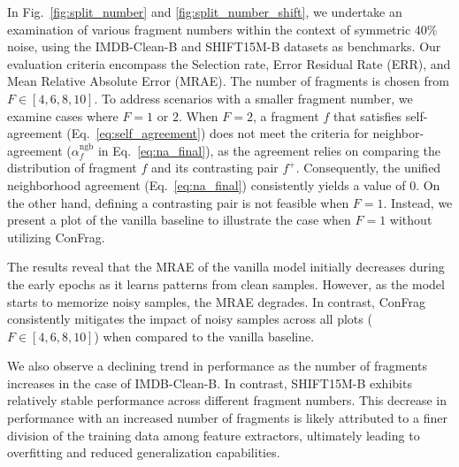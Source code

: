 \documentclass{article}
\theoremstyle{plain}
\theoremstyle{definition}
\theoremstyle{remark}
\begin{document}

In Fig.~\ref{fig:split_number} and \ref{fig:split_number_shift}, we undertake an examination of various fragment numbers within the context of symmetric 40\% noise, using the IMDB-Clean-B and SHIFT15M-B datasets as benchmarks. 
Our evaluation criteria encompass the Selection rate, Error Residual Rate (ERR), and Mean Relative Absolute Error (MRAE).
The number of fragments is chosen from $F\in[4, 6, 8, 10]$.
To address scenarios with a smaller fragment number, we examine cases where $F=1$ or $2$.
When $F=2$, a fragment $f$ that satisfies self-agreement (Eq.~\ref{eq:self_agreement}) does not meet the criteria for neighbor-agreement ($\alpha^\text{ngb}_f$ in Eq.~\ref{eq:na_final}),
as the agreement relies on comparing the distribution of fragment $f$ and its contrasting pair $f^+$.
Consequently, the unified neighborhood agreement (Eq.~\ref{eq:na_final}) consistently yields a value of $0$.
On the other hand, defining a contrasting pair is not feasible when $F=1$.
Instead, we present a plot of the vanilla baseline to illustrate the case when $F=1$ without utilizing ConFrag.

The results reveal that the MRAE of the vanilla model initially decreases during the early epochs as it learns patterns from clean samples.
However, as the model starts to memorize noisy samples, the MRAE degrades.
In contrast, ConFrag consistently mitigates the impact of noisy samples across all plots ($F\in[4,6,8,10]$) when compared to the vanilla baseline.

We also observe a declining trend in performance as the number of fragments increases in the case of IMDB-Clean-B. 
In contrast, SHIFT15M-B exhibits relatively stable performance across different fragment numbers. 
This decrease in performance with an increased number of fragments is likely attributed to a finer division of the training data among feature extractors, ultimately leading to overfitting and reduced generalization capabilities.
\end{document}

